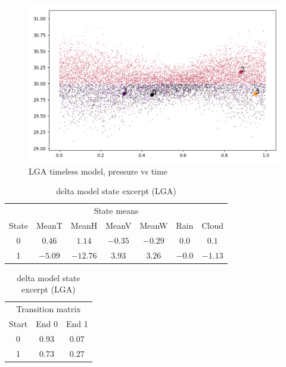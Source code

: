 \documentclass[a4paper]{article}
\begin{document}
\begin{figure}[t]
  \centering
  \includegraphics[width=\linewidth]{../png/models/LGA-timeless-pressure4.png}
  \caption{LGA timeless model, pressure vs time}
  \label{fig:LGA_timeless_pressure}
\end{figure}



\begin{table}[th]
  \caption{delta model state excerpt (LGA)}
  \label{tab:delta}
  \centering

  \begin{tabular}{c c c c c c c}
    \toprule 
    \multicolumn{7}{c}{State means}\\
      State&MeanT & MeanH & MeanV & MeanW & Rain & Cloud  \\
    \midrule
      0 & $ 0.46$  & $ 1.14 $ &  $-0.35$ &  $-0.29$  & $0.0$   &$ 0.1  $ \\
      1 & $-5.09$  & $-12.76$ &  $3.93 $ &  $3.26 $  & $-0.0$  &$-1.13 $  \\
    \bottomrule
  \end{tabular}

  \begin{tabular}{c c c}
    \toprule
    \multicolumn{3}{c}{Transition matrix}\\
    Start & End 0 & End 1 \\
    \midrule  
    0 & $0.93$ & $0.07$ \\
    1 & $0.73$ & $0.27$ \\
    \bottomrule
  \end{tabular}
\end{table}
\end{document}
